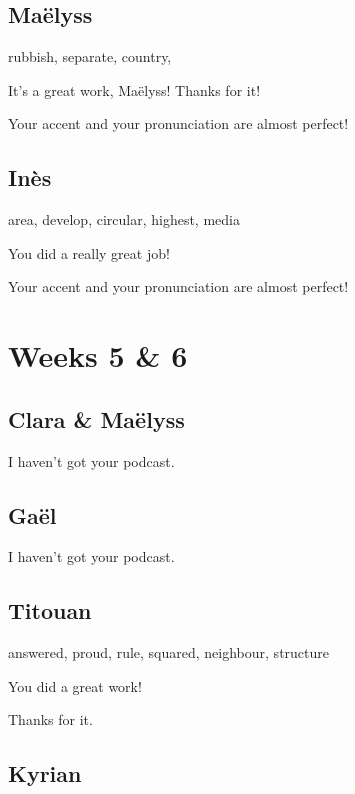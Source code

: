 \documentclass[12pt,oneside]{report}
\begin{document}
\begin{spacing}{1.2}
\subsection*{Maëlyss}

rubbish, separate, country, 

\color{blue}
It's a great work, Maëlyss! Thanks for it!

Your accent and your pronunciation are almost perfect!
\color{black}

\subsection*{Inès}

area, develop, circular, highest, media

\color{blue}
You did a really great job!

Your accent and your pronunciation are almost perfect!
\color{black}






\section{Weeks 5 \& 6}

\subsection*{Clara \& Maëlyss}

\color{blue}
I haven't got your podcast.
\color{black}

\subsection*{Gaël}

\color{blue}
I haven't got your podcast.
\color{black}

\subsection*{Titouan}

answered, proud, rule, squared, neighbour, structure

\color{blue}
You did a great work!

Thanks for it.
\color{black}

\subsection*{Kyrian}


\end{spacing}
\end{document}

